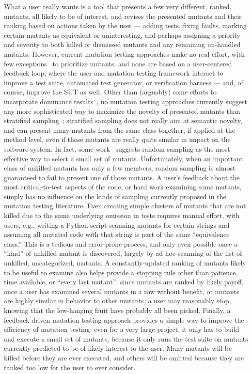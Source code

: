 What a user really wants is a tool that presents a few very different, ranked, mutants, all likely to be of interest, and revises the presented mutants and their ranking based on actions taken by the user --- adding tests, fixing faults, marking certain mutants as equivalent or uninteresting, and perhaps assigning a priority and severity to both killed or dismissed mutants and any remaining un-handled mutants. However, current mutation testing approaches make no real effort, with few exceptions~\cite{MutGoogle,FaRM} to prioritize mutants, and none are based on a user-centered feedback loop, where the user and mutation testing framework interact to improve a test suite, automated test generator, or verification harness --- and, of course, improve the SUT as well.  Other than (arguably) some efforts to incorporate dominance results~\cite{MutQuality}, no mutation testing approaches currently suggest any more sophisticated way to maximize the novelty of presented mutants than stratified sampling~\cite{gopinath2017mutation}; stratified sampling does not really aim at semantic novelty, and can present many mutants from the same class together, if applied at the method level, even if those mutants are really quite similar in impact on the software system.  In fact, some work~\cite{gopinath2015howhard} suggests random sampling as the most effective way to select a small set of mutants.  Unfortunately, when an important class of unkilled mutants has only a few members, random sampling is almost guaranteed to fail to present one of those mutants.  A user's feedback about the most critical-to-test aspects of the code, or hard work examining some mutants, simply has no influence on the kinds of sampling currently proposed in the mutation testing literature.  Even creating simple clusters of mutants that are not killed due to the same underlying omission in tests requires manual effort, with users, e.g., writing a Python script scanning mutants for certain strings and assuming all mutated code with that string is part of the same ``equivalence class.''  This is a tedious and error-prone process, and only even possible once a ``kind'' of unkilled mutant is discovered, largely by ad hoc scanning of the list of unkilled, uncategorized, mutants.  A constantly-updated ranking of mutants likely to be useful to examine also helps provide a stopping rule other than patience, time available, or ``every last mutant'':  since mutants are ranked by likely payoff, once a user has examined several mutants in a row without benefit, or mutants are highly similar in behavior to other mutants, a user may reasonably stop, knowing that the low-hanging fruit have probably all been picked.  Finally, a feedback-driven mutation testing approach provides a simple way to improve the efficiency of mutation testing:  even for a very large project, it only has to build and execute a small set of mutants, because it only runs the test suite on mutants currently predicted to be of likely interest to the user.  Many mutants will be killed before they are ever executed, and others will be omitted because they are ranked too low for the user to ever consider.

